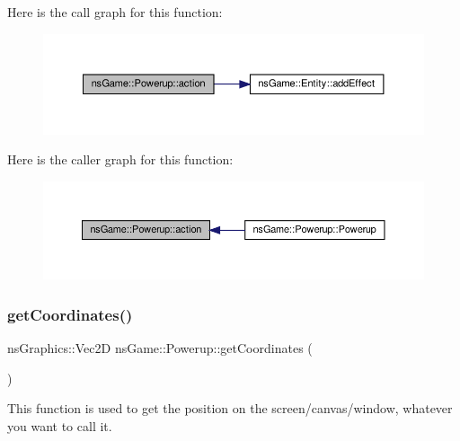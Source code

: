 Here is the call graph for this function\+:\nopagebreak
\begin{figure}[H]
\begin{center}
\leavevmode
\includegraphics[width=350pt]{classns_game_1_1_powerup_af307aba7b61132f2dc037d8ef62581f9_cgraph}
\end{center}
\end{figure}
Here is the caller graph for this function\+:\nopagebreak
\begin{figure}[H]
\begin{center}
\leavevmode
\includegraphics[width=350pt]{classns_game_1_1_powerup_af307aba7b61132f2dc037d8ef62581f9_icgraph}
\end{center}
\end{figure}
\mbox{\label{classns_game_1_1_powerup_a31700271cd7bd2040d26bcac7f437408}} 
\subsubsection{\texorpdfstring{get\+Coordinates()}{getCoordinates()}}
{\footnotesize\ttfamily ns\+Graphics\+::\+Vec2D ns\+Game\+::\+Powerup\+::get\+Coordinates (\begin{DoxyParamCaption}{ }\end{DoxyParamCaption})\hspace{0.3cm}{\ttfamily [inline]}}



This function is used to get the position on the screen/canvas/window, whatever you want to call it. 



